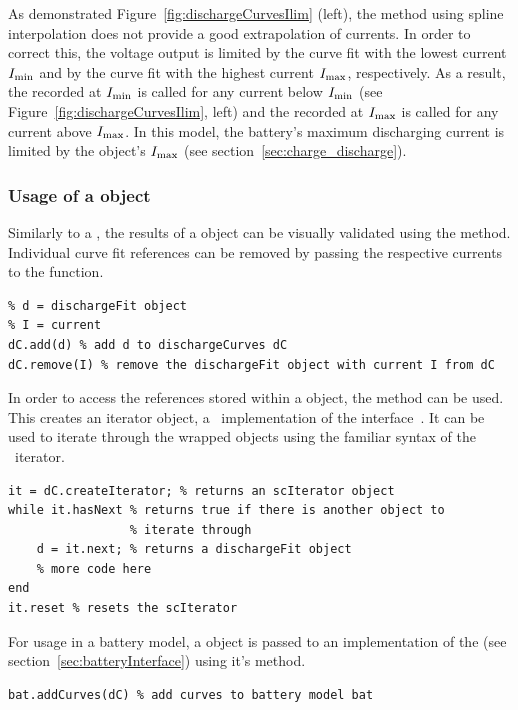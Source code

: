 As demonstrated Figure~\ref{fig:dischargeCurvesIlim} (left), the  method using spline interpolation does not provide a good extrapolation of currents. In order to correct this, the voltage output is limited by the curve fit with the lowest current $I_\text{min}$ and by the curve fit with the highest current $I_\text{max}$, respectively. As a result, the  recorded at $I_\text{min}$ is called for any current below $I_\text{min}$ (see Figure~\ref{fig:dischargeCurvesIlim}, left) and the  recorded at $I_\text{max}$ is called for any current above $I_\text{max}$. In this model, the battery's maximum discharging current is limited by the  object's $I_\text{max}$ (see section~\ref{sec:charge_discharge}).

\subsubsection{Usage of a  object}
Similarly to a , the results of a  object can be visually validated using the  method. Individual curve fit references can be removed by passing the respective currents to the  function. \clearpage
\begin{lstlisting}
% d = dischargeFit object
% I = current
dC.add(d) % add d to dischargeCurves dC
dC.remove(I) % remove the dischargeFit object with current I from dC
\end{lstlisting}
In order to access the  references stored within a  object, the  method can be used. This creates an iterator object, a \matlab\ implementation of the  interface~\cite{_iterator_????}. It can be used to iterate through the wrapped  objects using the familiar syntax of the \java\ iterator.
\begin{lstlisting}
it = dC.createIterator; % returns an scIterator object
while it.hasNext % returns true if there is another object to
				 % iterate through
	d = it.next; % returns a dischargeFit object
	% more code here
end
it.reset % resets the scIterator
\end{lstlisting}
For usage in a battery model, a  object is passed to an implementation of the  (see section~\ref{sec:batteryInterface}) using it's  method.
\begin{lstlisting}
bat.addCurves(dC) % add curves to battery model bat
\end{lstlisting}